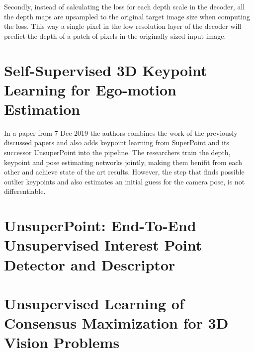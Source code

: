 Secondly, instead of calculating the loss for each depth scale in the decoder, all the depth maps are upsampled to the original target image size when computing the loss. This way a single pixel in the low resolution layer of the decoder will predict the depth of a patch of pixels in the originally sized input image.

\section{Self-Supervised 3D Keypoint Learning for Ego-motion Estimation}

In a paper\cite{keypointdepth} from 7 Dec 2019 the authors combines the work of the previously discussed papers and also adds keypoint learning from SuperPoint\cite{superpoint} and its successor UnsuperPoint\cite{unsuperpoint} into the pipeline. The researchers train the depth, keypoint and pose estimating networks jointly, making them benifit from each other and achieve state of the art results. However, the step that finds possible outlier keypoints and also estimates an initial guess for the camera pose, is not differentiable.

\section{UnsuperPoint: End-To-End Unsupervised Interest Point Detector and Descriptor}


\section{Unsupervised Learning of Consensus Maximization for 3D Vision Problems}


